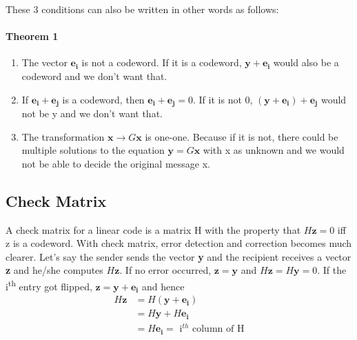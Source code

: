 \documentclass[11pt,a4paper]{article}
\begin{document}
These 3 conditions can also be written in other words as follows:
\paragraph{Theorem 1}
\begin{enumerate}
    \item The vector $\mathbf{e_i}$ is not a codeword. If it is a codeword, $\mathbf{y} + \mathbf{e_i}$ would also be a codeword and we don't want that.
    
    \item If $\mathbf{e_i} + \mathbf{e_j}$ is a codeword, then $\mathbf{e_i} + \mathbf{e_j} = 0$. If it is not 0, $(\mathbf{y} + \mathbf{e_i}) + \mathbf{e_j}$ would not be y and we don't want that.
    
    \item The transformation $\mathbf{x} \to G\mathbf{x}$ is one-one. Because if it is not, there could be multiple solutions to the equation $\mathbf{y} = G\mathbf{x}$ with x as unknown and we would not be able to decide the original message x. 
\end{enumerate}

\subsection{Check Matrix}
A check matrix for a linear code is a matrix H with the property that $H\mathbf{z} = 0$ iff z is a codeword. With check matrix, error detection and correction becomes much clearer. Let's say the sender sends the vector \textbf{y} and the recipient receives a vector \textbf{z} and he/she computes $H\mathbf{z}$. If no error occurred, $\mathbf{z} = \mathbf{y}$ and $H\mathbf{z} = H\mathbf{y} = 0$. If the i\textsuperscript{th} entry got flipped, $\mathbf{z} = \mathbf{y} + \mathbf{e_i}$ and hence
$$
\begin{aligned}
    H\mathbf{z} &= H(\mathbf{y} + \mathbf{e_i})\\
    &= H\mathbf{y} + H\mathbf{e_i}\\
    &= H\mathbf{e_i} = \text{ i}^{th} \text{ column of H}
\end{aligned}
$$
\end{document}
